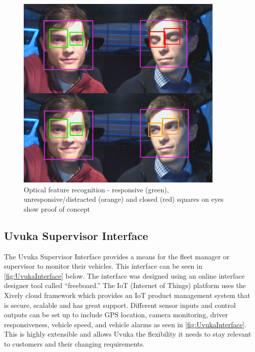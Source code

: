 \begin{figure}[H]
\centering
\includegraphics[width=0.9\textwidth]{images/ocv}
\vskip10pt
\caption[Optical feature recognition]{Optical feature recognition - responsive (green), unresponsive/distracted (orange) and closed (red) squares on eyes show proof of concept}
\label{fig:OpticalFeature}
\end{figure}

\newpage
\subsection{Uvuka Supervisor Interface}
The Uvuka Supervisor Interface provides a means for the fleet manager or supervisor to monitor their vehicles. This interface can be seen in \cref{fig:UvukaInterface} below. The interface was designed using an online interface designer tool called ``freeboard.'' The IoT (Internet of Things) platform uses the Xively cloud framework which provides an IoT  product management system that is secure, scalable and has great support. Different sensor inputs and control outputs can be set up to include GPS location, camera monitoring, driver responsiveness, vehicle speed, and vehicle alarms as seen in \cref{fig:UvukaInterface}. This is highly extensible and allows Uvuka the flexibility it needs to stay relevant to customers and their changing requirements.

